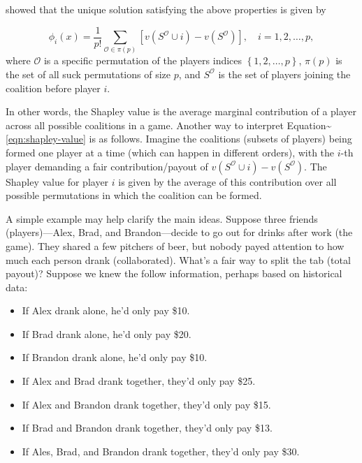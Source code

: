 \citep{shapley-2016-value} showed that the unique solution satisfying
the above properties is given by

\begin{equation}
\label{eqn:shapley-value}
\phi_i\left(x\right) = \frac{1}{p!} \sum_{\mathcal{O} \in \pi\left(p\right)} \left[v\left(S^\mathcal{O} \cup i\right) - v\left(S^\mathcal{O}\right)\right], \quad i = 1, 2, \dots, p,
\end{equation} where \(\mathcal{O}\) is a specific permutation of the
players indices \(\left\{1, 2, \dots, p\right\}\), \(\pi\left(p\right)\)
is the set of all suck permutations of size \(p\), and \(S^\mathcal{O}\)
is the set of players joining the coalition before player \(i\).

In other words, the Shapley value is the average marginal contribution
of a player across all possible coalitions in a game. Another way to
interpret Equation\textasciitilde{}\eqref{eqn:shapley-value} is as
follows. Imagine the coalitions (subsets of players) being formed one
player at a time (which can happen in different orders), with the
\(i\)-th player demanding a fair contribution/payout of
\(v\left(S^\mathcal{O} \cup i\right) - v\left(S^\mathcal{O}\right)\).
The Shapley value for player \(i\) is given by the average of this
contribution over all possible permutations in which the coalition can
be formed.

A simple example may help clarify the main ideas. Suppose three friends
(players)---Alex, Brad, and Brandon---decide to go out for drinks after
work (the game). They shared a few pitchers of beer, but nobody payed
attention to how much each person drank (collaborated). What's a fair
way to split the tab (total payout)? Suppose we knew the follow
information, perhaps based on historical data:

\begin{itemize}

  \item If Alex drank alone, he'd only pay \$10.
  
  \item If Brad drank alone, he'd only pay \$20.
  
  \item If Brandon drank alone, he'd only pay \$10.
  
  \item If Alex and Brad drank together, they'd only pay \$25.
  
  \item If Alex and Brandon drank together, they'd only pay \$15.
  
  \item If Brad and Brandon drank together, they'd only pay \$13.
  
  \item If Ales, Brad, and Brandon drank together, they'd only pay \$30.

\end{itemize}

